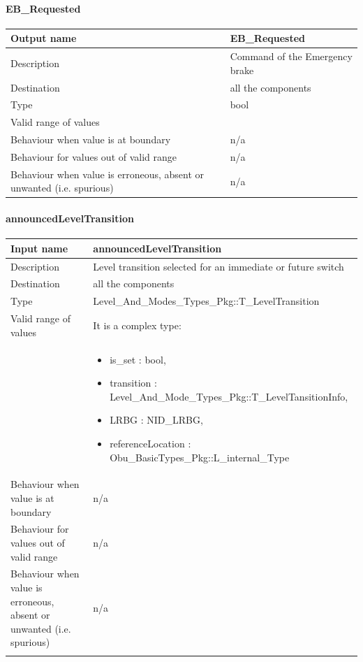 \paragraph{EB\_Requested}

\begin{longtable}{p{}p{}}
\toprule
Output name				& EB\_Requested \\
\midrule
Description				& Command of the Emergency brake \\
\midrule
Destination				& all the components \\ 
\midrule
Type					& bool \\
\midrule
Valid range of values	&  \\
\midrule
Behaviour when value is at boundary	& n/a \\ 
\midrule
Behaviour for values out of valid range	& n/a \\ 
\midrule
Behaviour when value is erroneous, absent or unwanted (i.e. spurious) & n/a \\
\bottomrule
\end{longtable}



\paragraph{announcedLevelTransition}

\begin{longtable}{p{}p{}}
\toprule
Input name				& announcedLevelTransition \\
\midrule
Description				& Level transition selected for an immediate or future switch \\
\midrule
Destination				& all the components \\ 
\midrule
Type					& Level\_And\_Modes\_Types\_Pkg::T\_LevelTransition \\
\midrule
Valid range of values	& It is a complex type:  \\
& \begin{itemize}
\item is\_set : bool,
\item transition : Level\_And\_Mode\_Types\_Pkg::T\_LevelTansitionInfo, 
\item LRBG : NID\_LRBG, 
\item referenceLocation : Obu\_BasicTypes\_Pkg::L\_internal\_Type
\end{itemize} \\
\midrule
Behaviour when value is at boundary	& n/a \\ 
\midrule
Behaviour for values out of valid range	& n/a \\ 
\midrule
Behaviour when value is erroneous, absent or unwanted (i.e. spurious) & n/a \\ 
\bottomrule \\ 
\end{longtable}


